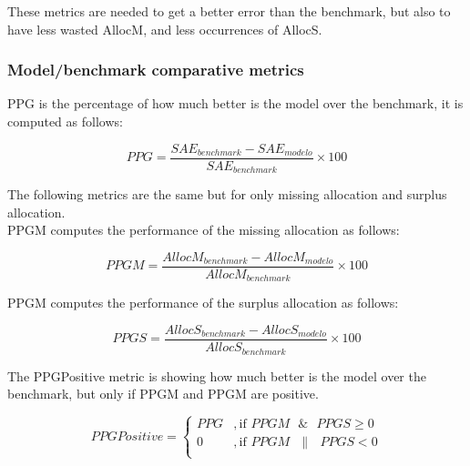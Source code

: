 These metrics are needed to get a better error than the benchmark, but also to have less wasted \gls{AllocM}, and less occurrences of \gls{AllocS}.\par

\subsubsection{Model/benchmark comparative metrics}

\gls{PPG} is the percentage of how much better is the model over the benchmark, it is computed as follows: 
\begin{linenomath}
    \begin{equation}\label{eq:PPG}
        PPG = \frac{SAE_{benchmark} - SAE_{modelo}}{SAE_{benchmark}} \times 100
    \end{equation}
    \end{linenomath}
		
The following metrics are the same but for only missing allocation and surplus allocation.\\
\gls{PPGM} computes the performance of the missing allocation as follows:\\

\begin{linenomath}
    \begin{equation}\label{eq:PPGM}
        PPGM = \frac{AllocM_{benchmark} - AllocM_{modelo}}{AllocM_{benchmark}} \times 100
    \end{equation}
    \end{linenomath}
		
\gls{PPGM} computes the performance of the surplus allocation as follows:

\begin{linenomath}
    \begin{equation}\label{eq:PPGS}
        PPGS = \frac{AllocS_{benchmark} - AllocS_{modelo}}{AllocS_{benchmark}} \times 100
    \end{equation}
    \end{linenomath}

The \gls{PPG}Positive metric is showing how much better is the model over the benchmark, but only if \gls{PPGM} and \gls{PPGM} are positive.\\

\begin{linenomath}
    \begin{equation}\label{eq:PPGPositive}
        PPG Positive = 
        \begin{cases} 
            PPG & , \text{if } PPGM \text{ }\&\text{ } PPGS \geq 0 \\
            0 & , \text{if } PPGM \text{ }\|\text{ } PPGS < 0 \\
        \end{cases} 
        \end{equation}
    \end{linenomath}
